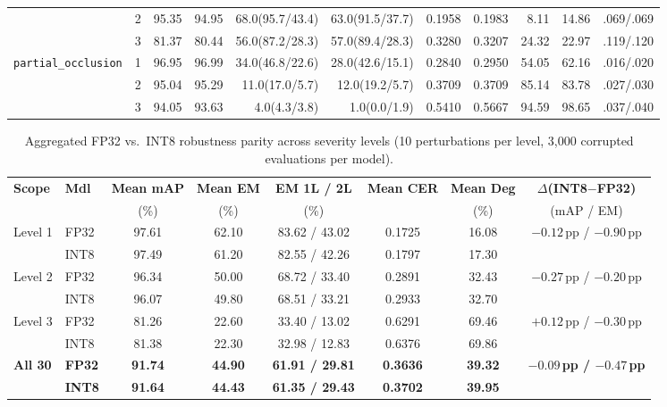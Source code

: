 \documentclass[pdflatex,sn-mathphys-num]{sn-jnl}
\begin{document}
\begin{table}[t]
{\begin{tabular}{@{}lc@{\hspace{3.5pt}}rr@{\hspace{3.5pt}}rr@{\hspace{3.5pt}}rr@{\hspace{3.5pt}}rr@{\hspace{3.5pt}}r@{}}
 & 2 & 95.35 & 94.95 & 68.0(95.7/43.4) & 63.0(91.5/37.7) & 0.1958 & 0.1983 & 8.11 & 14.86 & .069/.069 \\
 & 3 & 81.37 & 80.44 & 56.0(87.2/28.3) & 57.0(89.4/28.3) & 0.3280 & 0.3207 & 24.32 & 22.97 & .119/.120 \\
\midrule
\multirow{3}{*}{\texttt{partial\_occlusion}} & 1 & 96.95 & 96.99 & 34.0(46.8/22.6) & 28.0(42.6/15.1) & 0.2840 & 0.2950 & 54.05 & 62.16 & .016/.020 \\
 & 2 & 95.04 & 95.29 & 11.0(17.0/5.7) & 12.0(19.2/5.7) & 0.3709 & 0.3709 & 85.14 & 83.78 & .027/.030 \\
 & 3 & 94.05 & 93.63 & 4.0(4.3/3.8) & 1.0(0.0/1.9) & 0.5410 & 0.5667 & 94.59 & 98.65 & .037/.040 \\
\bottomrule
\end{tabular}%
}
\end{table}

\begin{table}[t]
\centering
\caption{Aggregated FP32 vs.\ INT8 robustness parity across severity levels (10 perturbations per level, 3,000 corrupted evaluations per model).}\label{tab:robustness_summary}
\footnotesize
\setlength{\tabcolsep}{1.7pt}
\begin{tabular}{@{}llcccccc@{}}
\toprule
\textbf{Scope} & \textbf{Mdl} & \textbf{Mean mAP} & \textbf{Mean EM} & \textbf{EM 1L / 2L} & \textbf{Mean CER} & \textbf{Mean Deg} & \textbf{$\Delta$(INT8$-$FP32)} \\
 & & (\%) & (\%) & (\%) & & (\%) & (mAP / EM) \\
\midrule
\multirow{2}{*}{Level 1} & FP32 & 97.61 & 62.10 & 83.62 / 43.02 & 0.1725 & 16.08 & \multirow{2}{*}{$-0.12$\,pp / $-0.90$\,pp} \\
 & INT8 & 97.49 & 61.20 & 82.55 / 42.26 & 0.1797 & 17.30 & \\
\midrule
\multirow{2}{*}{Level 2} & FP32 & 96.34 & 50.00 & 68.72 / 33.40 & 0.2891 & 32.43 & \multirow{2}{*}{$-0.27$\,pp / $-0.20$\,pp} \\
 & INT8 & 96.07 & 49.80 & 68.51 / 33.21 & 0.2933 & 32.70 & \\
\midrule
\multirow{2}{*}{Level 3} & FP32 & 81.26 & 22.60 & 33.40 / 13.02 & 0.6291 & 69.46 & \multirow{2}{*}{$+0.12$\,pp / $-0.30$\,pp} \\
 & INT8 & 81.38 & 22.30 & 32.98 / 12.83 & 0.6376 & 69.86 & \\
\midrule
\multirow{2}{*}{\textbf{All 30}} & \textbf{FP32} & \textbf{91.74} & \textbf{44.90} & \textbf{61.91 / 29.81} & \textbf{0.3636} & \textbf{39.32} & \multirow{2}{*}{\textbf{$-0.09$\,pp / $-0.47$\,pp}} \\
 & \textbf{INT8} & \textbf{91.64} & \textbf{44.43} & \textbf{61.35 / 29.43} & \textbf{0.3702} & \textbf{39.95} & \\
\bottomrule
\end{tabular}
\end{table}
\end{document}
